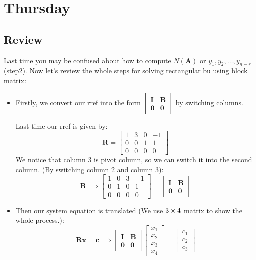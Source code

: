

\section{Thursday}
\subsection{Review}
Last time you may be confused about how to compute $N(\bm A)$ or $y_1,y_2,\dots,y_{n-r}$ (step2). Now let's review the whole steps for solving rectangular bu using block matrix:\\
\begin{itemize}
\item
Firstly, we convert our rref into the form $\begin{bmatrix}
\bm I&\bm B\\\bm 0&\bm 0
\end{bmatrix}$ by switching columns.
\begin{example}
Last time our rref is given by:
\[
\bm R = \begin{bmatrix}
1&3&0&-1\\0&0&1&1\\0&0&0&0
\end{bmatrix}
\]
We notice that column 3 is pivot column, so we can switch it into the second column. (By switching column 2 and column 3):
\[
\bm R\implies \begin{bmatrix}
1&0&3&-1\\0&1&0&1\\0&0&0&0
\end{bmatrix} = \begin{bmatrix}
\bm I&\bm B\\\bm 0&\bm 0
\end{bmatrix}
\]
\end{example}
\item
Then our system equation is translated (We use $3\times 4$ matrix to show the whole process.):
\[
\bm{Rx} = \bm c\implies \begin{bmatrix}
\bm I&\bm B\\\bm 0&\bm 0
\end{bmatrix}\begin{bmatrix}
x_1\\x_2\\x_3\\x_4
\end{bmatrix} = \begin{bmatrix}
c_1\\c_2\\c_3
\end{bmatrix}
\]
\newpage


\end{itemize}
